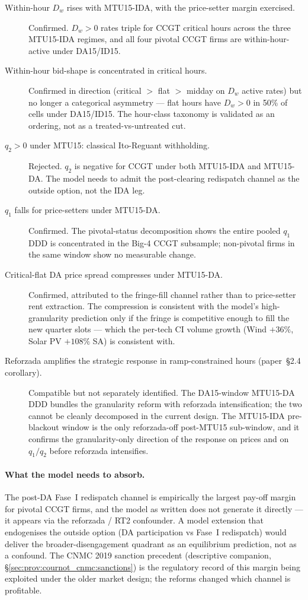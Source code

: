 \documentclass[11pt,a4paper]{article}
\begin{document}
\begin{description}
\item[Within-hour $D_w$ rises with MTU15-IDA, with the price-setter margin exercised.] Confirmed. $D_w > 0$ rates triple for CCGT critical hours across the three MTU15-IDA regimes, and all four pivotal CCGT firms are within-hour-active under DA15/ID15.
\item[Within-hour bid-shape is concentrated in critical hours.] Confirmed in direction (critical $>$ flat $>$ midday on $D_w$ active rates) but no longer a categorical asymmetry --- flat hours have $D_w > 0$ in 50\% of cells under DA15/ID15. The hour-class taxonomy is validated as an ordering, not as a treated-vs-untreated cut.
\item[$q_2 > 0$ under MTU15: classical Ito-Reguant withholding.] Rejected. $q_2$ is negative for CCGT under both MTU15-IDA and MTU15-DA. The model needs to admit the post-clearing redispatch channel as the outside option, not the IDA leg.
\item[$q_1$ falls for price-setters under MTU15-DA.] Confirmed. The pivotal-status decomposition shows the entire pooled $q_1$ DDD is concentrated in the Big-4 CCGT subsample; non-pivotal firms in the same window show no measurable change.
\item[Critical-flat DA price spread compresses under MTU15-DA.] Confirmed, attributed to the fringe-fill channel rather than to price-setter rent extraction. The compression is consistent with the model's high-granularity prediction only if the fringe is competitive enough to fill the new quarter slots --- which the per-tech CI volume growth (Wind $+36\%$, Solar PV $+108\%$ SA) is consistent with.
\item[Reforzada amplifies the strategic response in ramp-constrained hours (paper~\S2.4 corollary).] Compatible but not separately identified. The DA15-window MTU15-DA DDD bundles the granularity reform with reforzada intensification; the two cannot be cleanly decomposed in the current design. The MTU15-IDA pre-blackout window is the only reforzada-off post-MTU15 sub-window, and it confirms the granularity-only direction of the response on prices and on $q_1/q_2$ before reforzada intensifies.
\end{description}

\paragraph{What the model needs to absorb.} The post-DA Fase~I redispatch channel is empirically the largest pay-off margin for pivotal CCGT firms, and the model as written does not generate it directly --- it appears via the reforzada / RT2 confounder. A model extension that endogenises the outside option (DA participation vs Fase~I redispatch) would deliver the broader-disengagement quadrant as an equilibrium prediction, not as a confound. The CNMC 2019 sanction precedent (descriptive companion, \S\ref{sec:prov:cournot_cnmc:sanctions}) is the regulatory record of this margin being exploited under the older market design; the reforms changed which channel is profitable.
\end{document}
